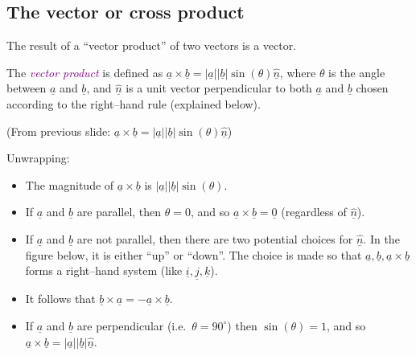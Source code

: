\documentclass[
  english,
  11pt,
  oneside]{book}
\providecommand{\tightlist}{%
  \setlength{\itemsep}{0pt}\setlength{\parskip}{0pt}}
\newcommand{\slide}{}
\theoremstyle{definition}
\theoremstyle{definition}
\theoremstyle{definition}
\theoremstyle{definition}
\theoremstyle{remark}
\begin{document}
\begin{slidesonly}

\slide

\hbox{}
\slide

\end{slidesonly}

\subsection{The vector or cross product}\label{the-vector-or-cross-product}

The result of a ``vector product'' of two vectors is a vector.

The \textcolor{purple}{\em vector product} is defined as \(\underline a \times\underline b = |\underline a||\underline b|\sin(\theta)\underline{\hat n}\), where \(\theta\) is the angle between \(\underline{a}\) and \(\underline{b}\), and \(\underline{\hat{n}}\) is a unit vector perpendicular to both \(\underline{a}\) and \(\underline{b}\) chosen according to the right--hand rule (explained below).

\slide

\begin{slidesonly}

(From previous slide: \(\underline a \times\underline b = |\underline a||\underline b|\sin(\theta)\underline{\hat n}\))

\end{slidesonly}

Unwrapping:

\begin{itemize}
\tightlist
\item
  The magnitude of \(\underline a\times\underline b\) is \(|\underline a||\underline b|\sin(\theta)\).
\item
  If \(\underline{a}\) and \(\underline{b}\) are parallel, then \(\theta=0\), and so \(\underline{a}\times\underline{b} = \underline{0}\) (regardless of \(\underline{\hat{n}}\)).
\item
  If \(\underline{a}\) and \(\underline{b}\) are not parallel, then there are two potential choices for \(\underline{\hat{n}}\). In the figure below, it is either ``up'' or ``down''. The choice is made so that \(\underline{a}, \underline{b}, \underline{a}\times\underline{b}\) forms a right--hand system (like \(\underline{i},\underline{j},\underline{k}\)).
\item
  It follows that \(\underline{b}\times \underline{a} = - \underline{a}\times\underline{b}\).
\item
  If \(\underline a\) and \(\underline b\) are perpendicular (i.e.~\(\theta = 90^\circ\)) then \(\sin(\theta)= 1\), and so \(\underline a \times\underline b = |\underline a||\underline b|\underline {\hat n}\).
\end{itemize}
\end{document}
